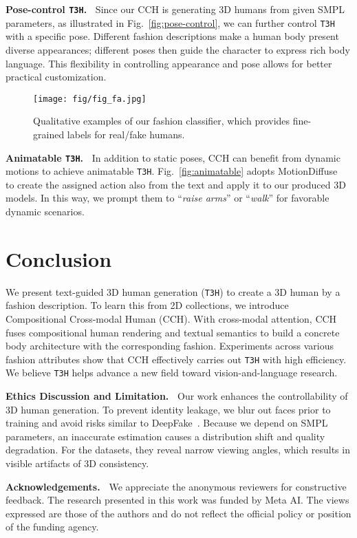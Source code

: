\documentclass[11pt]{article}
\begin{document}
\vspace{1ex} \noindent \textbf{Pose-control \texttt{T3H}.~}
Since our CCH is generating 3D humans from given SMPL parameters, as illustrated in Fig.~\ref{fig:pose-control}, we can further control \texttt{T3H} with a specific pose. Different fashion descriptions make a human body present diverse appearances; different poses then guide the character to express rich body language. This flexibility in controlling appearance and pose allows for better practical customization.

\begin{figure}[t]
\centering
    \texttt{[image: fig/fig\_fa.jpg]}
    \vspace{-1ex}
    \caption{Qualitative examples of our fashion classifier, which provides fine-grained labels for real/fake humans.}
    \vspace{-3ex}
    \label{fig:fa}
\end{figure}

\vspace{1ex} \noindent \textbf{Animatable \texttt{T3H}.~}
In addition to static poses, CCH can benefit from dynamic motions to achieve animatable \texttt{T3H}. Fig.~\ref{fig:animatable} adopts MotionDiffuse~\cite{zhang2022motion-diffuse} to create the assigned action also from the text and apply it to our produced 3D models. In this way, we prompt them to ``\textit{raise arms}'' or ``\textit{walk}'' for favorable dynamic scenarios.

\section{Conclusion}
We present text-guided 3D human generation (\texttt{T3H}) to create a 3D human by a fashion description. To learn this from 2D collections, we introduce Compositional Cross-modal Human (CCH). With cross-modal attention, CCH fuses compositional human rendering and textual semantics to build a concrete body architecture with the corresponding fashion. Experiments across various fashion attributes show that CCH effectively carries out \texttt{T3H} with high efficiency. We believe \texttt{T3H} helps advance a new field toward vision-and-language research.

\vspace{1ex} \noindent \textbf{Ethics Discussion and Limitation.~} Our work enhances the controllability of 3D human generation. To prevent identity leakage, we blur out faces prior to training and avoid risks similar to DeepFake~\cite{korshunov2018deep-fake}. Because we depend on SMPL parameters, an inaccurate estimation causes a distribution shift and quality degradation. For the datasets, they reveal narrow viewing angles, which results in visible artifacts of 3D consistency. 

\vspace{1ex} \noindent \textbf{Acknowledgements.~}
We appreciate the anonymous reviewers for constructive feedback. The research presented in this work was funded by Meta AI. The views expressed are those of the authors and do not reflect the official policy or position of the funding
agency.



\end{document}
